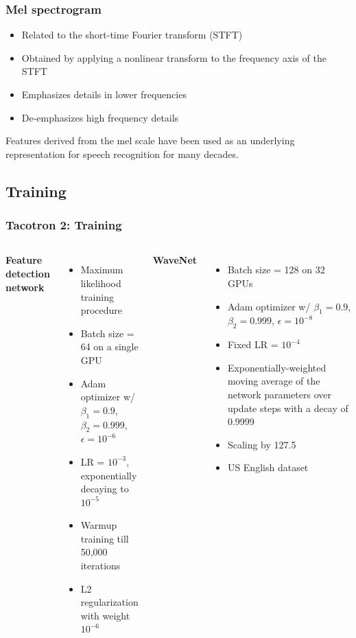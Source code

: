 \documentclass{beamer}
\begin{document}
  \begin{frame}
    \frametitle{Mel spectrogram}
      \begin{itemize}
        \item Related to the short-time Fourier transform (STFT)
        \item Obtained by applying a nonlinear transform to the frequency axis of the STFT
        \item Emphasizes details in lower frequencies
        \item De-emphasizes high frequency details
      \end{itemize}
      Features derived from the mel scale have been used as an underlying representation for speech recognition for many decades. 
  \end{frame}

  \subsection{Training}
  \begin{frame}
    \frametitle{Tacotron 2: Training}
    \begin{columns}
        \textbf{Feature detection network}
        \begin{itemize}
          \item Maximum likelihood training procedure
          \item Batch size = 64 on a single GPU
          \item Adam optimizer w/ $\beta_1=0.9$, $\beta_2=0.999$, $\epsilon=10^{-6}$
          \item LR = $10^{-3}$, exponentially decaying to $10^{-5}$
          \item Warmup training till 50,000 iterations
          \item L2 regularization with weight $10^{-6}$
        \end{itemize}
        \textbf{WaveNet}
        \begin{itemize}
          \item Batch size = 128 on 32 GPUs
          \item Adam optimizer w/ $\beta_1=0.9$, $\beta_2=0.999$, $\epsilon=10^{-8}$
          \item Fixed LR = $10^{-4}$
          \item Exponentially-weighted moving average of the network parameters over update steps with a decay of 0.9999
          \item Scaling by 127.5
          \item US English dataset
        \end{itemize}
    \end{columns}
  \end{frame}
\end{document}
